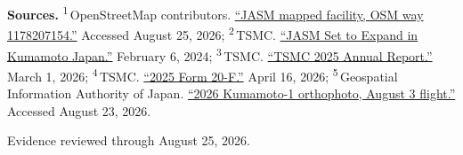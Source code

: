\begin{minipage}[t][0.90\textheight][t]{\textwidth}
{\sffamily\scriptsize\setlength{\emergencystretch}{1.5em}\textbf{Sources.} \textsuperscript{1}\,OpenStreetMap contributors. \href{\detokenize{https://www.openstreetmap.org/way/1178207154}}{\enquote{JASM mapped facility, OSM way 1178207154.}} Accessed August 25, 2026; \textsuperscript{2}\,TSMC. \href{\detokenize{https://pr.tsmc.com/english/news/3105}}{\enquote{JASM Set to Expand in Kumamoto Japan.}} February 6, 2024; \textsuperscript{3}\,TSMC. \href{\detokenize{https://investor.tsmc.com/sites/ir/annual-report/2025/2025}\%\detokenize{20TSMC}\%\detokenize{20Annual}\%\detokenize{20Report.E.pdf}}{\enquote{TSMC 2025 Annual Report.}} March 1, 2026; \textsuperscript{4}\,TSMC. \href{\detokenize{https://investor.tsmc.com/sites/ir/sec-filings/2025_20F}\%\detokenize{20Report.pdf}}{\enquote{2025 Form 20-F.}} April 16, 2026; \textsuperscript{5}\,Geospatial Information Authority of Japan. \href{\detokenize{https://maps.gsi.go.jp/development/ichiran.html}}{\enquote{2026 Kumamoto-1 orthophoto, August 3 flight.}} Accessed August 23, 2026.\par}
\vfill
\noindent{\color{hairline}\rule{\linewidth}{0.4pt}}\par\smallskip
{\sffamily\scriptsize\color{black!58} Evidence reviewed through August 25, 2026.\par}
\end{minipage}
\clearpage
